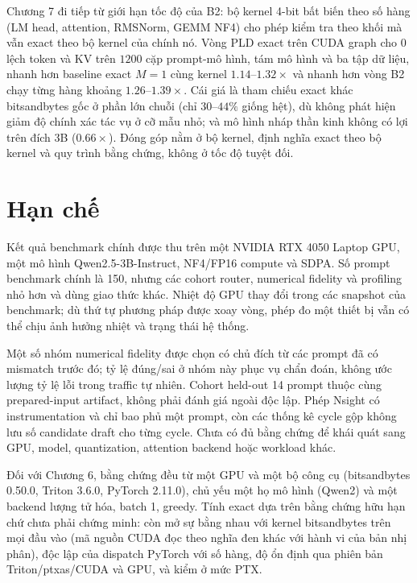 Chương 7 đi tiếp từ giới hạn tốc độ của B2: bộ kernel 4-bit bất biến theo số hàng (LM head, attention, RMSNorm, GEMM NF4) cho phép kiểm tra theo khối mà vẫn exact theo bộ kernel của chính nó. Vòng PLD exact trên CUDA graph cho $0$ lệch token và KV trên $1200$ cặp prompt-mô hình, tám mô hình và ba tập dữ liệu, nhanh hơn baseline exact $M{=}1$ cùng kernel $1.14$--$1.32\times$ và nhanh hơn vòng B2 chạy từng hàng khoảng $1.26$--$1.39\times$. Cái giá là tham chiếu exact khác bitsandbytes gốc ở phần lớn chuỗi (chỉ $30$--$44\%$ giống hệt), dù không phát hiện giảm độ chính xác tác vụ ở cỡ mẫu nhỏ; và mô hình nháp thần kinh không có lợi trên đích $3$B ($0.66\times$). Đóng góp nằm ở bộ kernel, định nghĩa exact theo bộ kernel và quy trình bằng chứng, không ở tốc độ tuyệt đối.

\section{Hạn chế}

Kết quả benchmark chính được thu trên một NVIDIA RTX 4050 Laptop GPU, một mô hình Qwen2.5-3B-Instruct, NF4/FP16 compute và SDPA. Số prompt benchmark chính là 150, nhưng các cohort router, numerical fidelity và profiling nhỏ hơn và dùng giao thức khác. Nhiệt độ GPU thay đổi trong các snapshot của benchmark; dù thứ tự phương pháp được xoay vòng, phép đo một thiết bị vẫn có thể chịu ảnh hưởng nhiệt và trạng thái hệ thống.

Một số nhóm numerical fidelity được chọn có chủ đích từ các prompt đã có mismatch trước đó; tỷ lệ đúng/sai ở nhóm này phục vụ chẩn đoán, không ước lượng tỷ lệ lỗi trong traffic tự nhiên. Cohort held-out 14 prompt thuộc cùng prepared-input artifact, không phải đánh giá ngoài độc lập. Phép Nsight có instrumentation và chỉ bao phủ một prompt, còn các thống kê cycle gộp không lưu số candidate draft cho từng cycle. Chưa có đủ bằng chứng để khái quát sang GPU, model, quantization, attention backend hoặc workload khác.

Đối với Chương 6, bằng chứng đều từ một GPU và một bộ công cụ (bitsandbytes 0.50.0, Triton 3.6.0, PyTorch 2.11.0), chủ yếu một họ mô hình (Qwen2) và một backend lượng tử hóa, batch 1, greedy. Tính exact dựa trên bằng chứng hữu hạn chứ chưa phải chứng minh: còn mở sự bằng nhau với kernel bitsandbytes trên mọi đầu vào (mã nguồn CUDA đọc theo nghĩa đen khác với hành vi của bản nhị phân), độc lập của dispatch PyTorch với số hàng, độ ổn định qua phiên bản Triton/ptxas/CUDA và GPU, và kiểm ở mức PTX.

